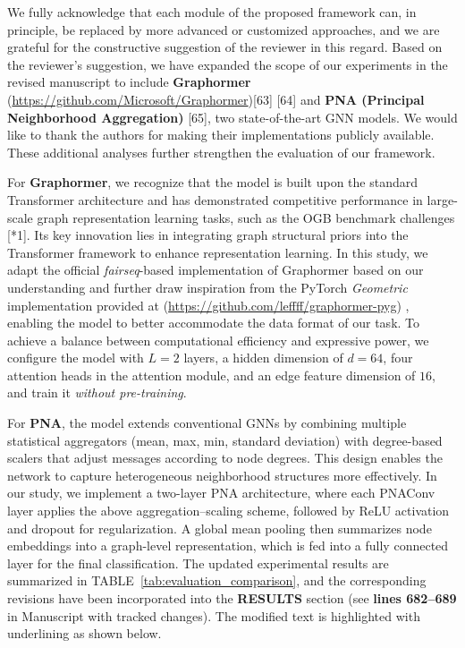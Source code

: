 \documentclass[12pt,technote,onecolumn]{IEEEtran}
\begin{document}
We fully acknowledge that each module of the proposed framework can, in principle, be replaced by more advanced or customized approaches, and we are grateful for the constructive suggestion of the reviewer in this regard. Based on the reviewer's suggestion, we have expanded the scope of our experiments in the revised manuscript to include \textbf{Graphormer} (\url{https://github.com/Microsoft/Graphormer})[63] [64] and \textbf{PNA (Principal Neighborhood Aggregation)} [65], two state-of-the-art GNN models. We would like to thank the authors for making their implementations publicly available. These additional analyses further strengthen the evaluation of our framework. 

For \textbf{Graphormer}, we recognize that the model is built upon the standard Transformer architecture and has demonstrated competitive performance in large-scale graph representation learning tasks, such as the OGB benchmark challenges [*1]. Its key innovation lies in integrating graph structural priors into the Transformer framework to enhance representation learning. In this study, we adapt the official \textit{fairseq}-based implementation of Graphormer based on our understanding and further draw inspiration from the PyTorch \textit{Geometric} implementation provided at (\url{https://github.com/leffff/graphormer-pyg})
, enabling the model to better accommodate the data format of our task. To achieve a balance between computational efficiency and expressive power, we configure the model with $L=2$ layers, a hidden dimension of $d=64$, four attention heads in the attention module, and an edge feature dimension of $16$, and train it \textit{without pre-training}.

For \textbf{PNA}, the model extends conventional GNNs by combining multiple statistical aggregators (mean, max, min, standard deviation) with degree-based scalers that adjust messages according to node degrees. This design enables the network to capture heterogeneous neighborhood structures more effectively. In our study, we implement a two-layer PNA architecture, where each PNAConv layer applies the above aggregation–scaling scheme, followed by ReLU activation and dropout for regularization. A global mean pooling then summarizes node embeddings into a graph-level representation, which is fed into a fully connected layer for the final classification.
The updated experimental results are summarized in TABLE~\ref{tab:evaluation_comparison}, and the corresponding revisions have been incorporated into the \textbf{RESULTS} section (see \textbf{lines 682–689} in Manuscript with tracked changes). The modified text is highlighted with underlining as shown below.
\end{document}

